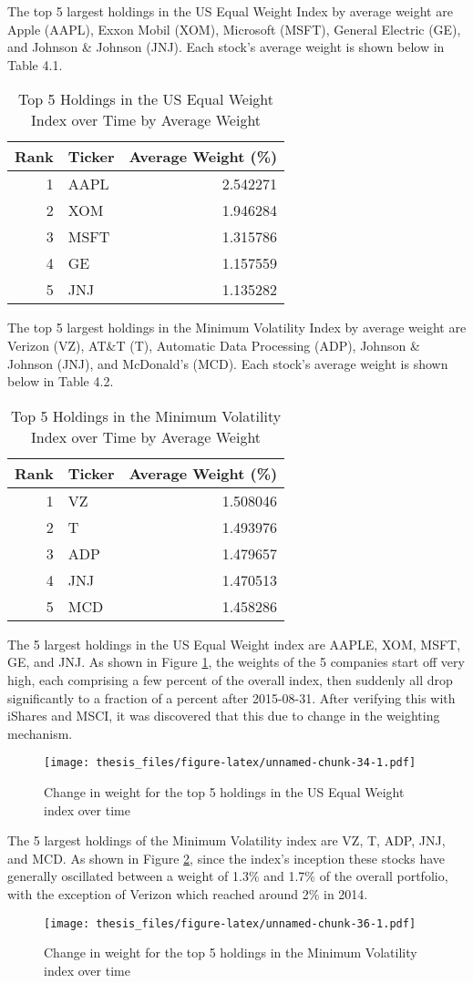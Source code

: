\documentclass[12pt,twoside]{reedthesis}
\theoremstyle{definition}
\theoremstyle{definition}
\theoremstyle{definition}
\theoremstyle{remark}
\begin{document}
The top 5 largest holdings in the US Equal Weight Index by average
weight are Apple (AAPL), Exxon Mobil (XOM), Microsoft (MSFT), General
Electric (GE), and Johnson \& Johnson (JNJ). Each stock's average weight
is shown below in Table 4.1.
\begin{longtable}[t]{rlr}
\caption{\label{tab:unnamed-chunk-30}Top 5 Holdings in the US Equal Weight Index over Time by Average Weight}\\
\toprule
Rank & Ticker & Average Weight (\%)\\
\midrule
1 & AAPL & 2.542271\\
2 & XOM & 1.946284\\
3 & MSFT & 1.315786\\
4 & GE & 1.157559\\
5 & JNJ & 1.135282\\
\bottomrule
\end{longtable}
The top 5 largest holdings in the Minimum Volatility Index by average
weight are Verizon (VZ), AT\&T (T), Automatic Data Processing (ADP),
Johnson \& Johnson (JNJ), and McDonald's (MCD). Each stock's average
weight is shown below in Table 4.2.
\begin{longtable}[t]{rlr}
\caption{\label{tab:unnamed-chunk-32}Top 5 Holdings in the Minimum Volatility Index over Time by Average Weight}\\
\toprule
Rank & Ticker & Average Weight (\%)\\
\midrule
1 & VZ & 1.508046\\
2 & T & 1.493976\\
3 & ADP & 1.479657\\
4 & JNJ & 1.470513\\
5 & MCD & 1.458286\\
\bottomrule
\end{longtable}
The 5 largest holdings in the US Equal Weight index are AAPLE, XOM,
MSFT, GE, and JNJ. As shown in Figure \ref{fig:plot5}, the weights of
the 5 companies start off very high, each comprising a few percent of
the overall index, then suddenly all drop significantly to a fraction of
a percent after 2015-08-31. After verifying this with iShares and MSCI,
it was discovered that this due to change in the weighting
mechanism.\newline
\begin{figure}[htbp]
\centering
\texttt{[image: thesis\_files/figure-latex/unnamed-chunk-34-1.pdf]}
\caption{\label{fig:unnamed-chunk-34}Change in weight for the top 5 holdings
in the US Equal Weight index over time\label{fig:plot5}}
\end{figure}
\newline
The 5 largest holdings of the Minimum Volatility index are VZ, T, ADP,
JNJ, and MCD. As shown in Figure \ref{fig:plot6}, since the index's
inception these stocks have generally oscillated between a weight of
1.3\% and 1.7\% of the overall portfolio, with the exception of Verizon
which reached around 2\% in 2014.
\begin{figure}[htbp]
\centering
\texttt{[image: thesis\_files/figure-latex/unnamed-chunk-36-1.pdf]}
\caption{\label{fig:unnamed-chunk-36}Change in weight for the top 5 holdings
in the Minimum Volatility index over time\label{fig:plot6}}
\end{figure}
\clearpage
\end{document}
